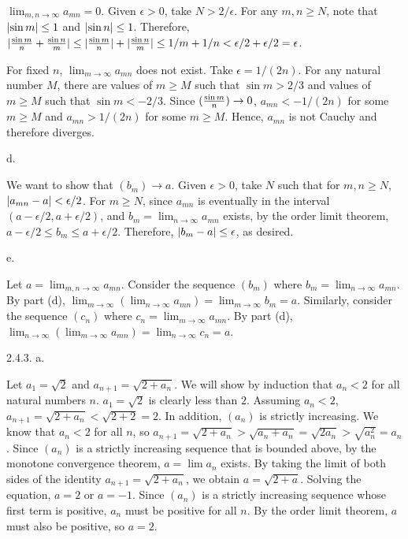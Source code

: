 $\lim _{m,n \to \infty} a_{mn} = 0$.
Given $\epsilon > 0$, take $N > 2/\epsilon$.
For any $m,n \ge N$, note that $\vert{\sin m}\vert \le 1$ and $\vert{\sin n}\vert \le 1$.
Therefore, $\vert{{\sin m \over n} + {\sin n \over m}}\vert \le
\vert{\sin m \over n}\vert + \vert{\sin n \over m}\vert \le 1/m + 1/n <
\epsilon/2 + \epsilon/2 = \epsilon$.

For fixed $n$, $\lim _{m \to \infty} a_{mn}$ does not exist.
Take $\epsilon = 1 / (2n)$.
For any natural number $M$,
there are values of $m \ge M$ such that $\sin m > 2/3$ and
values of $m \ge M$ such that $\sin m < -2/3$.
Since $({\sin m \over n}) \to 0$,
$a_{mn} < -1 / (2n)$ for some $m \ge M$ and
$a_{mn} > 1 / (2n)$ for some $m \ge M$.
Hence, $a_{mn}$ is not Cauchy and therefore diverges.
\medskip
\item{} d.

We want to show that $(b_m) \to a$.
Given $\epsilon > 0$, take $N$ such that
for $m,n \ge N$, $\vert{a_{mn} - a}\vert < \epsilon / 2$.
For $m \ge N$, since $a_{mn}$ is eventually
in the interval $(a - \epsilon / 2, a + \epsilon / 2)$,
and $b_m = \lim _{n \to \infty} a_{mn}$ exists,
by the order limit theorem, $a - \epsilon / 2 \le b_m \le a + \epsilon / 2$.
Therefore, $\vert{b_m - a}\vert \le \epsilon$, as desired.
\medskip
\item{} e.

Let $a = \lim _{m,n \to \infty} a_{mn}$.
Consider the sequence $(b_m)$
where $b_m = \lim _{n \to \infty} a_{mn}$.
\hfil\break
By part (d), $\lim _{m \to \infty} (\lim _{n \to \infty} a_{mn}) =
\lim _{m \to \infty} b_m = a$.
Similarly, consider the sequence $(c_n)$
where $c_n = \lim _{m \to \infty} a_{mn}$.
By part (d), $\lim _{n \to \infty} (\lim _{m \to \infty} a_{mn}) =
\lim _{n \to \infty} c_n = a$.
\bigskip
\item{2.4.3.} a.

Let $a_1 = \sqrt 2$ and $a_{n + 1} = \sqrt {2 + a_n}$.
We will show by induction that $a_n < 2$ for all natural numbers $n$.
$a_1 = \sqrt 2$ is clearly less than $2$.
Assuming $a_n < 2$, $a_{n + 1} = \sqrt {2 + a_n} < \sqrt {2 + 2} = 2$.
In addition, $(a_n)$ is strictly increasing.
We know that $a_n < 2$ for all $n$, so
$a_{n + 1} = \sqrt {2 + a_n} > \sqrt {a_n + a_n} = \sqrt {2a_n} > \sqrt {a_n ^2} = a_n$.
Since $(a_n)$ is a strictly increasing sequence that is bounded above,
by the monotone convergence theorem, $a = \lim a_n$ exists.
By taking the limit of both sides of the identity
$a_{n + 1} = \sqrt {2 + a_n}$, we obtain $a = \sqrt {2 + a}$.
Solving the equation, $a = 2$ or $a = -1$.
Since $(a_n)$ is a strictly increasing sequence whose first term is positive,
$a_n$ must be positive for all $n$.
By the order limit theorem, $a$ must also be positive, so $a = 2$.

